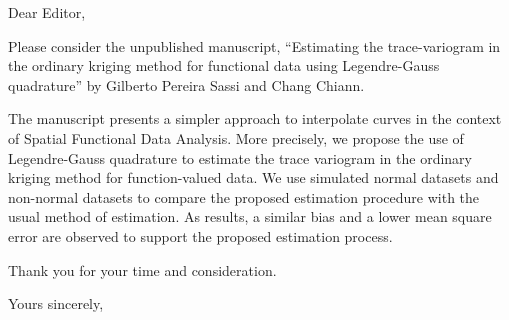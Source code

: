 \documentclass[11pt]{letter}
\begin{document}
\begin{letter}{}

\opening{Dear Editor,}

Please consider the unpublished manuscript, ``Estimating the trace-variogram in the ordinary kriging method for functional data using Legendre-Gauss quadrature'' 
by Gilberto Pereira Sassi and Chang Chiann.

The manuscript presents a simpler approach to interpolate curves in the context of Spatial Functional Data Analysis.
More precisely, we propose the use of Legendre-Gauss quadrature to estimate the trace 
variogram in the ordinary kriging method for function-valued data. 
We use simulated normal datasets and non-normal datasets to compare the proposed estimation procedure with the usual method of estimation. As results, a similar bias and a lower mean square error are
observed to support the proposed estimation process.


Thank you for your time and consideration.

\closing{Yours sincerely,}

\end{letter}
\end{document}
